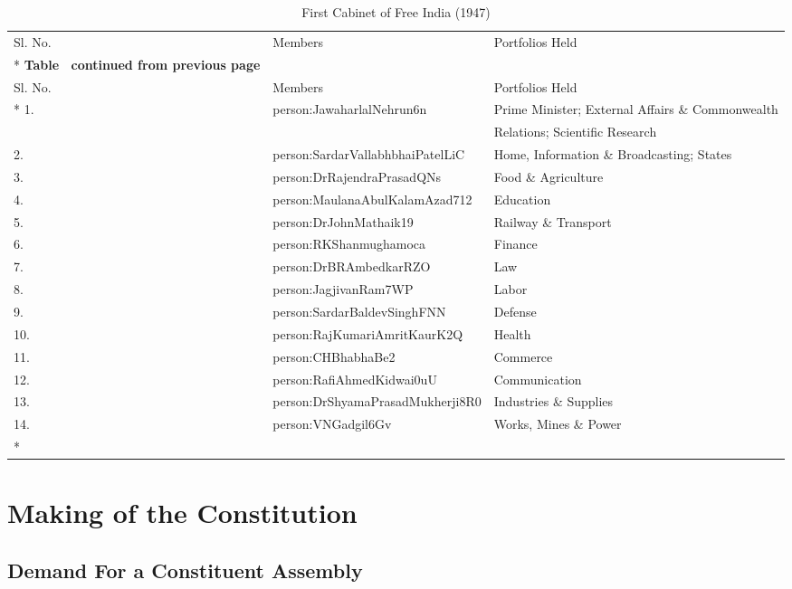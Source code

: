 \begin{longtable}[c]{@{}|p{.7cm}|p{5cm}|p{7cm}|@{}}
	\caption{First Cabinet of Free India (1947)}
	\label{tbl:firstCabinetOfFreeIndia}\\
	\toprule
	Sl. No. & Members & Portfolios Held \\* \midrule
	\endfirsthead
	\multicolumn{3}{c}%
	{{\bfseries Table \thetable\ continued from previous page}} \\
	\toprule
	Sl. No. & Members & Portfolios Held \\* \midrule
	\endhead
	\bottomrule
	\endfoot
	\endlastfoot
	1. & \gls{person:JawaharlalNehrun6n} & Prime Minister; External Affairs \& Commonwealth \\
	&                           & Relations; Scientific Research \\
	2. & \gls{person:SardarVallabhbhaiPatelLiC} & Home, Information \& Broadcasting; States \\
	3. & \gls{person:DrRajendraPrasadQNs} & Food \& Agriculture \\
	4. & \gls{person:MaulanaAbulKalamAzad712} & Education \\
	5. & \gls{person:DrJohnMathaik19} & Railway \& Transport \\
	6. & \gls{person:RKShanmughamoca} & Finance \\
	7. & \gls{person:DrBRAmbedkarRZO} & Law \\
	8. & \gls{person:JagjivanRam7WP} & Labor \\
	9. & \gls{person:SardarBaldevSinghFNN} & Defense \\
	10. & \gls{person:RajKumariAmritKaurK2Q} & Health \\
	11. & \gls{person:CHBhabhaBe2} & Commerce \\
	12. & \gls{person:RafiAhmedKidwai0uU} & Communication \\
	13. & \gls{person:DrShyamaPrasadMukherji8R0} & Industries \& Supplies \\
	14. & \gls{person:VNGadgil6Gv} & Works, Mines \& Power \\* \bottomrule
\end{longtable}

\theendnotes
\cleardoublepage
\twocolumn

\chapter{Making of the Constitution}

\section{Demand For a Constituent Assembly}

